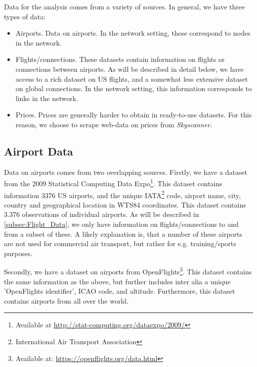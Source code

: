 \label{sec:data}
Data for the analysis comes from a variety of sources.
In general, we have three types of data:
\begin{itemize}
    \item Airports. Data on airports. In the network setting, these correspond to nodes in the network.
    \item Flights/connections. These datasets contain information on flights or connections between airports. As will be described in detail below, we have access to a rich dataset on US flights, and a somewhat less extensive dataset on global connections. In the network setting, this information corresponds to links in the network.
    \item Prices. Prices are generally harder to obtain in ready-to-use datasets. For this reason, we choose to scrape web-data on prices from \textit{Skyscanner}.
\end{itemize}

\subsection{Airport Data}
Data on airports comes from two overlapping sources. Firstly, we have a dataset from the 2009 Statistical Computing Data Expo\footnote{Available at \url{http://stat-computing.org/dataexpo/2009/}}. This dataset contains information 3376 US airports, and the unique IATA\footnote{International Air Transport Association} code, airport name, city, country and geographical location in WTS84 coordinates. This dataset contains 3.376 observations of individual airports. As will be described in \ref{subsec:Flight_Data}, we only have information on flights/connections to and from a subset of these. A likely explanation is, that a number of these airports are not used for commercial air transport, but rather for e.g. training/sports purposes.\par
Secondly, we have a dataset on airports from OpenFlights\footnote{Available at: \url{https://openflights.org/data.html}}. This dataset contains the same information as the above, but further includes inter alia a unique 'OpenFlights identifier', ICAO code, and altitude. Furthermore, this dataset contains airports from all over the world.

